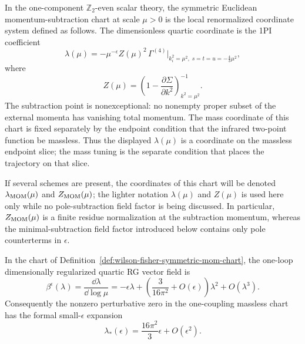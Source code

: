 \begin{definition}
\label{def:wilson-fisher-symmetric-mom-chart}
In the one-component \(\mathbb Z_2\)-even scalar theory, the symmetric
Euclidean momentum-subtraction chart at scale \(\mu>0\) is the local
renormalized coordinate system defined as follows.  The dimensionless quartic
coordinate is the 1PI coefficient
\[
  \lambda(\mu)
  =
  -\mu^{-\epsilon}Z(\mu)^2\,
  \Gamma^{(4)}
  \bigg|_{k_i^2=\mu^2,\;s=t=u=-\frac43\mu^2},
\]
where
\[
  Z(\mu)
  =
  \left(
    1-\frac{\partial\Sigma}{\partial k^2}
  \right)^{-1}_{k^2=\mu^2}.
\]
The subtraction point is nonexceptional: no nonempty proper subset of the
external momenta has vanishing total momentum.  The mass coordinate of this
chart is fixed separately by the endpoint condition that the infrared
two-point function be massless.  Thus the displayed \(\lambda(\mu)\) is a
coordinate on the massless endpoint slice; the mass tuning is the separate
condition that places the trajectory on that slice.

If several schemes are present, the coordinates of this chart will be denoted
\(\lambda_{\rm MOM}(\mu)\) and \(Z_{\rm MOM}(\mu)\); the lighter notation
\(\lambda(\mu)\) and \(Z(\mu)\) is used here only while no pole-subtraction
field factor is being discussed.  In particular, \(Z_{\rm MOM}(\mu)\) is a
finite residue normalization at the subtraction momentum, whereas the
minimal-subtraction field factor introduced below contains only pole
counterterms in \(\epsilon\).
\end{definition}

\begin{lemma}
\label{lem:wilson-fisher-one-loop-quartic-vector-field}
In the chart of
Definition~\ref{def:wilson-fisher-symmetric-mom-chart}, the one-loop
dimensionally regularized quartic RG vector field is
\[
  \beta^\epsilon(\lambda)
  =
  \frac{\dd\lambda}{\dd\log\mu}
  =
  -\epsilon\lambda
  +
  \left(\frac{3}{16\pi^2}+O(\epsilon)\right)\lambda^2
  +
  O(\lambda^3).
\]
Consequently the nonzero perturbative zero in the one-coupling massless chart
has the formal small-\(\epsilon\) expansion
\[
  \lambda_*(\epsilon)
  =
  \frac{16\pi^2}{3}\epsilon+O(\epsilon^2).
\]
\end{lemma}

